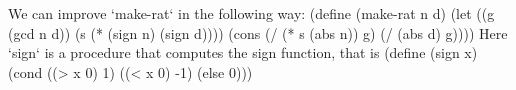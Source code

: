 We can improve `make-rat` in the following way:
\begtt\scm
(define (make-rat n d)
  (let ((g (gcd n d))
        (s (* (sign n) (sign d))))
    (cons (/ (* s (abs n)) g) (/ (abs d) g))))
\endtt
Here `sign` is a procedure that computes the sign function, that is
\begtt\scm
(define (sign x)
  (cond ((> x 0) 1)
        ((< x 0) -1)
        (else 0)))
\endtt
